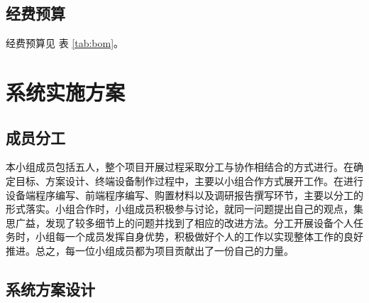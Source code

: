 \documentclass[UTF8]{ctexart}
\begin{document}
\subsection{经费预算}
经费预算见 表 \ref{tab:bom}。
\begin{table}[htbp]
    \noindent{}
    \caption{经费预算}\label{tab:bom}
\end{table}

\section{系统实施方案}
\subsection{成员分工}
本小组成员包括五人，整个项目开展过程采取分工与协作相结合的方式进行。在确定目标、方案设计、终端设备制作过程中，主要以小组合作方式展开工作。在进行设备端程序编写、前端程序编写、购置材料以及调研报告撰写环节，主要以分工的形式落实。小组合作时，小组成员积极参与讨论，就同一问题提出自己的观点，集思广益，发现了较多细节上的问题并找到了相应的改进方法。分工开展设备个人任务时，小组每一个成员发挥自身优势，积极做好个人的工作以实现整体工作的良好推进。总之，每一位小组成员都为项目贡献出了一份自己的力量。
\subsection{系统方案设计}
\end{document}
